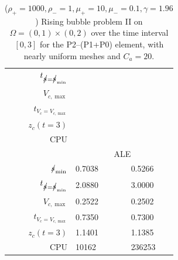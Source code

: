 \begin{table}
\begin{tabular}{rlll}
$t_{\strikes = \strikes_{\min}}$ & & & \\
$V_{c,\max}$                     & & & \\
$t_{V_c = V_{c,\max}}$           & & & \\
$z_c(t=3)$                       & & & \\
CPU                              & & & \\
\cmidrule{2-4}
& \multicolumn{3}{c}{ALE} \\
\cmidrule{2-4}
$\mbox{$s\!\!\!\!\:/$}_{\min}$                & 0.7038 & & 0.5266 \\
$t_{\strikes = \strikes_{\min}}$ & 2.0880 & & 3.0000 \\
$V_{c,\max}$                     & 0.2522 & & 0.2502 \\
$t_{V_c = V_{c,\max}}$           & 0.7350 & & 0.7300 \\
$z_c(t=3)$                       & 1.1401 & & 1.1385 \\
CPU                              &  10162 & & 236253 \\
\hline
\end{tabular}
\hspace*{-3.25cm}
\caption[Navier--Stokes 2d rising bubble II benchmark values P2--(P1+P0)]
{($\rho_+ = 1000,\rho_- = 1,\mu_+ = 10,\mu_- =0.1,\gamma = 1.96$)
Rising bubble problem II on ${\Omega = (0,1) \times (0,2)}$ over the time
interval $[0,3]$ for the P2--(P1+P0) element, with nearly uniform meshes and
$C_a=20$\textdegree.}
\label{tab:risingbubble2DIIp2p1p0}
\end{table}